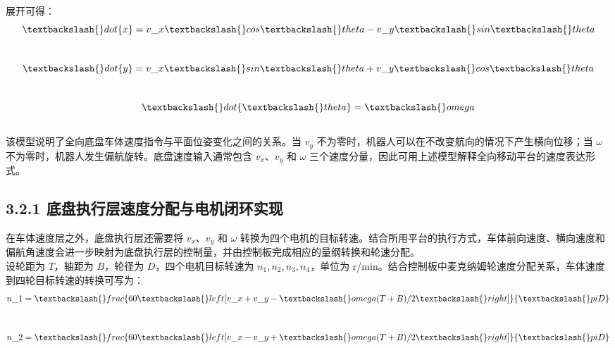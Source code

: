 \documentclass[UTF8,a4paper,12pt]{ctexrep}
\begin{document}
展开可得：\\

$$\\
\textbackslash\{\}dot\{x\}=v\_x\textbackslash\{\}cos\textbackslash\{\}theta-v\_y\textbackslash\{\}sin\textbackslash\{\}theta\\
$$\\

$$\\
\textbackslash\{\}dot\{y\}=v\_x\textbackslash\{\}sin\textbackslash\{\}theta+v\_y\textbackslash\{\}cos\textbackslash\{\}theta\\
$$\\

$$\\
\textbackslash\{\}dot\{\textbackslash\{\}theta\}=\textbackslash\{\}omega\\
$$\\

该模型说明了全向底盘车体速度指令与平面位姿变化之间的关系。当 $v_y$ 不为零时，机器人可以在不改变航向的情况下产生横向位移；当 $\omega$ 不为零时，机器人发生偏航旋转。底盘速度输入通常包含 $v_x$、$v_y$ 和 $\omega$ 三个速度分量，因此可用上述模型解释全向移动平台的速度表达形式。\\

\subsection{3.2.1 底盘执行层速度分配与电机闭环实现}

在车体速度层之外，底盘执行层还需要将 $v_x$、$v_y$ 和 $\omega$ 转换为四个电机的目标转速。结合所用平台的执行方式，车体前向速度、横向速度和偏航角速度会进一步映射为底盘执行层的控制量，并由控制板完成相应的量纲转换和轮速分配。\\

设轮距为 $T$，轴距为 $B$，轮径为 $D$，四个电机目标转速为 $n_1,n_2,n_3,n_4$，单位为 r/min。结合控制板中麦克纳姆轮速度分配关系，车体速度到四轮目标转速的转换可写为：\\

$$\\
n\_1=\textbackslash\{\}frac\{60\textbackslash\{\}left[v\_x+v\_y-\textbackslash\{\}omega(T+B)/2\textbackslash\{\}right]\}\{\textbackslash\{\}pi D\}\\
$$\\

$$\\
n\_2=\textbackslash\{\}frac\{60\textbackslash\{\}left[v\_x-v\_y+\textbackslash\{\}omega(T+B)/2\textbackslash\{\}right]\}\{\textbackslash\{\}pi D\}\\
$$\\
\end{document}
